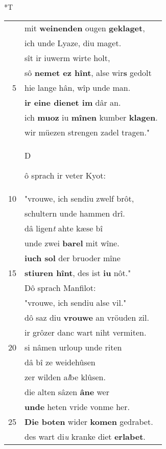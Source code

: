 \documentclass[8pt,a4paper,notitlepage]{article}
\begin{document}
\begin{table}[ht]
\begin{minipage}[t]{0.5\linewidth}
\end{minipage}
\hspace{0.5cm}
\begin{minipage}[t]{0.5\linewidth}
\small
\begin{center}*T
\end{center}
\begin{tabular}{rl}
 & mit \textbf{weinenden} ougen \textbf{geklaget},\\ 
 & ich unde Lyaze, diu maget.\\ 
 & sît ir iuwerm wirte holt,\\ 
 & sô \textbf{nemet ez hînt}, alse wir\textbf{s} gedolt\\ 
5 & hie lange hân, wîp unde man.\\ 
 & \textbf{ir eine dienet im} dâr an.\\ 
 & ich \textbf{muoz} iu \textbf{mînen} kumber \textbf{klagen}.\\ 
 & wir müezen strengen zadel tragen."\\ 
 & \begin{large}D\end{large}ô sprach ir veter Kyot:\\ 
10 & "vrouwe, ich sendiu zwelf brôt,\\ 
 & schultern unde hammen drî.\\ 
 & dâ ligen\textit{t} ahte kæse bî\\ 
 & unde zwei \textbf{barel} mit wîne.\\ 
 & \textbf{iuch sol} der bruoder mîne\\ 
15 & \textbf{stiuren hînt}, des ist \textbf{iu} nôt."\\ 
 & Dô sprach Manfilot:\\ 
 & "vrouwe, ich sendiu alse vil."\\ 
 & dô saz diu \textbf{vrouwe} an vröuden zil.\\ 
 & ir grôzer danc wart niht vermiten.\\ 
20 & si nâmen urloup unde riten\\ 
 & dâ bî ze weidehûsen\\ 
 & zer wilden a\textit{l}be klûsen.\\ 
 & die alten sâzen \textbf{âne} wer\\ 
 & \textbf{unde} heten vride vonme her.\\ 
25 & \textbf{Die boten} wider \textbf{komen} gedrabet.\\ 
 & des wart di\textit{u} kranke diet \textbf{erlabet}.\\ 

\end{tabular}
\end{minipage}
\end{table}
\end{document}
